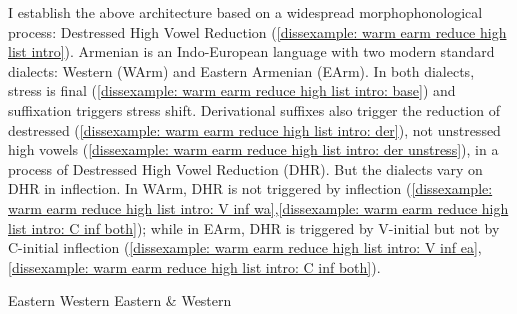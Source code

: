 I establish the above architecture  based on a widespread morphophonological process: Destressed High Vowel Reduction (\ref{dissexample: warm earm reduce high list intro}). Armenian is an Indo-European language with two modern standard dialects: Western (WArm) and Eastern Armenian (EArm). In both dialects,   stress is final  (\ref{dissexample: warm earm reduce high list intro: base}) and suffixation triggers stress shift. Derivational suffixes also  trigger   the reduction of {destressed}  (\ref{dissexample: warm earm reduce high list intro: der}), not {unstressed} high vowels (\ref{dissexample: warm earm reduce high list intro: der unstress}), in a process of  Destressed High Vowel Reduction (DHR). But the   dialects vary on DHR in inflection. In WArm, DHR is not triggered by inflection (\ref{dissexample: warm earm reduce high list intro: V inf wa},\ref{dissexample: warm earm reduce high list intro: C inf both}); while in EArm, DHR is triggered by V-initial but not by  C-initial inflection (\ref{dissexample: warm earm reduce high list intro: V inf ea},\ref{dissexample: warm earm reduce high list intro: C inf both}).

\begin{exe}
	
	\ex 
	\begin{xlist}
		
		\ex {}\label{dissexample: warm earm reduce high list intro: base} 
		\ex {}\label{dissexample: warm earm reduce high list intro: der} 
		\ex \makebox[3cm][l]{}\label{dissexample: warm earm reduce high list intro: der unstress} 
		
		\ex {}Eastern\label{dissexample: warm earm reduce high list intro: V inf ea} 
		\ex \makebox[3cm][l]{}Western\label{dissexample: warm earm reduce high list intro: V inf wa} 
		\ex {}Eastern \& Western\label{dissexample: warm earm reduce high list intro: C inf both} 
	\end{xlist}\label{dissexample: warm earm reduce high list intro}
	
	
\end{exe}



